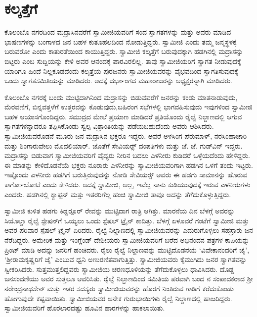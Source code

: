
\chapter{ಕಲ್ಕತ್ತೆಗೆ}

 ಕೊಲಂಬೊ ನಗರದಿಂದ ಮದ್ರಾಸಿನವರೆಗೆ ಸ್ವಾಮೀಜಿಯವರಿಗೆ ಸಂದ ಸ್ವಾಗತಗಳನ್ನು ಮತ್ತು ಅವರು ಮಾಡಿದ ಭಾಷಣಗಳನ್ನು ಬಂಗಾಳದ ಜನ ಬಹಳ ಕುತೂಹಲದಿಂದ ನೋಡುತ್ತಿದ್ದರು. ಸ್ವಾಮೀಜಿ ಎಂದು ತಮ್ಮ ಜನ್ಮಸ್ಥಳಕ್ಕೆ ಬರುವರೋ ಎಂದು ಕಾತುರತೆಯಿಂದ ಕಾಯುತ್ತಿದ್ದರು. ಸ್ವಾಮೀಜಿ ಕಲ್ಕತ್ತೆಗೆ ಬರುವುದಕ್ಕಾಗಿ ಹಡಗಿನಲ್ಲಿ ಮದ್ರಾಸನ್ನು ಬಿಟ್ಟರು ಎಂಬ ಸುದ್ದಿಯನ್ನು ಕೇಳಿ ಅವರ ಆನಂದಕ್ಕೆ ಪಾರವಿರಲಿಲ್ಲ. ತಾವು ಸ್ವಾಮೀಜಿಯರಿಗೆ ಸ್ವಾಗತ ನೀಡುವುದಕ್ಕೆ ಯಾರಿಗೂ ಹಿಂದೆ ನಿಲ್ಲಕೂಡದೆಂದು ಕಲ್ಕತ್ತೆಯ ಪುರಜನರು ಸ್ವಾಮೀಜಿಯವರನ್ನು ವೈಭವದಿಂದ ಸ್ವಾಗತಿಸುವುದಕ್ಕೆ ಒಂದು ಸ್ವಾಗತಸಮಿತಿಯನ್ನು ಮಾಡಿದರು. ಅದಕ್ಕೆ ದರ್ಭಾಂಗದ ಮಹಾರಾಜರನ್ನು ಅಧ್ಯಕ್ಷರನ್ನಾಗಿ ಮಾಡಿದರು. 

\newpage

 ಕೊಲಂಬೊ ನಗರಕ್ಕೆ ಬಂದು ಮುಟ್ಟಿದಾಗಿನಿಂದ ಮದ್ರಾಸನ್ನು ಬಿಡುವವರೆಗೆ ಜನರನ್ನು ಕಂಡು ಮಾತನಾಡುವುದು, ಮೆರವಣಿಗೆ, ಬಿನ್ನವತ್ತಳೆಗೆ ಉತ್ತರವನ್ನು ಕೊಡುವುದು,\break ಬಹಿರಂಗ ಸಭೆಗಳಲ್ಲಿ ಭಾಗವಹಿಸುವುದು ಇವುಗಳಿಂದ ಸ್ವಾಮೀಜಿ ಬಹಳ ಆಯಾಸಗೊಂಡಿದ್ದರು. ಸಮುದ್ರದ ಮೇಲೆ ಪ್ರಯಾಣ ಮಾಡಿದರೆ ಪ್ರತಿಯೊಂದು ರೈಲ್ವೆ ನಿಲ್ದಾಣದಲ್ಲಿ ಆಗುವ ಸ್ವಾಗತಗಳನ್ನಾದರೂ ತಪ್ಪಿಸಿಕೊಂಡು ಸ್ವಲ್ಪ ವಿಶ್ರಾಂತಿಯನ್ನು ಪಡೆಯಬಹುದೆಂದು ಅವರು ಆಶಿಸಿದರು. ಸ್ವಾಮೀಜಿಯವರೊಡನೆ ಮೂರು ಜನ ಮದ್ರಾಸಿನ ಭಕ್ತರೂ ಇದ್ದರು. ಅವರೆ ಅಳಸಿಂಗ ಪೆರುಮಾಳ್, ನರಸಿಂಹಾಚಾರಿ ಮತ್ತು ಶಿಂಗಾರುವೇಲು ಮೊದಲಿಯಾರ್. ಜೊತೆಗೆ ಸೇವಿಯರ್ಸ್‍‍ ದಂಪತಿಗಳು ಮತ್ತು ಜೆ. ಜೆ. ಗುಡ್‍ವಿನ್ ಇದ್ದರು. ಮದ್ರಾಸನ್ನು ಬಿಡುವಾಗ ಸ್ವಾಮೀಜಿಯವರಿಗೆ ವೈದ್ಯರು ನೀರಿನ ಬದಲು ಎಳನೀರು ಕುಡಿದರೆ ಒಳ್ಳೆಯದೆಂದು ಹೇಳಿದ್ದರು. ಈ ಮಾತನ್ನು ಕೇಳಿದೊಡನೆಯೆ ಭಕ್ತರು ನೂರಾರು ಎಳನೀರನ್ನು ಸ್ವಾಮೀಜಿಯವರಿಗಾಗಿ ಹಡಗಿನ ಒಳಗೆ ತಂದು ಇಟ್ಟರು. ಇಷ್ಟೊಂದು ಎಳನೀರು ಹಡಗಿಗೆ ಬರುತ್ತಿರುವುದನ್ನು ನೋಡಿ ಸೇವಿಯರ್ಸ್‍‍ ಅವರು ಈ ಹಡಗು ಸಾಮಾನನ್ನು ಹೊರುವ ಕಾರ್ಗೋಬೋಟೆ ಎಂದು ಕೇಳಿದರು. ಅದಕ್ಕೆ ಸ್ವಾಮೀಜಿ, ಅಲ್ಲ, ಇವೆಲ್ಲ ನಾನು ಕುಡಿಯುವುದಕ್ಕೆ ಇರುವ ಎಳನೀರುಗಳು ಎಂದರು. ಹಡಗಿನಲ್ಲಿ ಕ್ಯಾಪ್ಟನ್ ಮತ್ತು ಇತರರಿಗೆಲ್ಲ ಹಂಚಿ ಸ್ವಾಮೀಜಿ ತಾವೂ ಅದನ್ನು ತೆಗೆದುಕೊಳ್ಳುತ್ತಿದ್ದರು. 

\vskip 3pt

 ಸ್ವಾಮೀಜಿ ಕುಳಿತ ಹಡಗು ಕಿಡ್ಡರ್‍ಪೂರ್ ರೇವನ್ನು ಮುಟ್ಟಿದಾಗ ರಾತ್ರಿ ಆಗಿತ್ತು. ಮಾರನೆಯ ದಿನ ಬೆಳಗ್ಗೆ ಅವರನ್ನು ಸಿಯೊಲ್ಡಾ ರೈಲ್ವೆ ಸ್ಟೇಷನ್‍ಗೆ ಒಯ್ಯಲು ಒಂದು ಸ್ಪೆಷಲ್ ಟ್ರೈನ್ ಕಾದಿತ್ತು. ಬೆಳಗ್ಗೆ ಏಳೂವರೆ ಗಂಟೆಗೆ ಸ್ವಾಮೀಜಿ ಮತ್ತು ಅವರ ಪರಿವಾರ ಸ್ಪೆಷಲ್ ಟ್ರೈನ್ ಏರಿದರು. ರೈಲ್ವೆ ನಿಲ್ದಾಣದಲ್ಲಿ ಸ್ವಾಮೀಜಿಯವರನ್ನು ಎದುರುಗೊಳ್ಳಲು ಸಹಸ್ರಾರು ಜನ ನೆರೆದಿದ್ದರು. ಅಮೇರಿಕ ಮತ್ತು ಇಂಗ್ಲೆಂಡ್ ದೇಶೀಯರು ಸ್ವಾಮೀಜಿಯವರಿಗೆ ಬರೆದ ಅಭಿನಂದನ ಪತ್ರಗಳ ಕಾಪಿಯನ್ನು ಪ್ರಿಂಟ್ ಮಾಡಿ ಅದನ್ನು ಜನರಿಗೆ ಹಂಚಿದರು. ರೈಲು ರೈಲ್ವೆ ನಿಲ್ದಾಣವನ್ನು ಮುಟ್ಟಿದೊಡನೆಯೆ ‘ವಿವೇಕಾನಂದರಿಗೆ ಜೈ’, ‘ಶ‍್ರೀರಾಮಕೃಷ್ಣರಿಗೆ ಜೈ’ ಎಂಬುವ ಧ್ವನಿ ಅಣುರಣಿತವಾಗುತ್ತಿತ್ತು. ಸ್ವಾಮೀಜಿಯವರು ಕೈಮುಗಿದು ಜನರ ಸ್ವಾಗತವನ್ನು ಸ್ವೀಕರಿಸಿದರು. ಸುತ್ತಮುತ್ತಲಿದ್ದವರು ಸ್ವಾಮೀಜಿಯ ಚರಣಧೂಳಿಯನ್ನು ತೆಗೆದುಕೊಳ್ಳಲು ಧಾವಿಸಿದರು. ದೊಡ್ಡ ಜನಸಂದಣಿಯು ಅವರ ಸುತ್ತಲೂ ಆವರಿಸಿತು. ರೈಲ್ವೆ ನಿಲ್ದಾಣದಿಂದ ಸಮಿತಿಯ ಪರವಾಗಿ ಬಂದ  ನ ಸಂಪಾದಕರಾದ ಶ‍್ರೀ ನರೇಂದ್ರನಾಥಸೇನ್ ಮತ್ತು ಇತರ ಸದಸ್ಯರು ಸ್ವಾಮೀಜಿಯವರನ್ನು ಹೊರಗೆ ನಿಂತಿರುವ ಗಾಡಿಗೆ ಕರೆದುಕೊಂಡು ಹೋಗುವುದೇ ಕಷ್ಟವಾಯಿತು. ಸ್ವಾಮೀಜಿಯವರ ಅನೇಕ ಗುರುಭಾಯಿಗಳು ರೈಲ್ವೆ ನಿಲ್ದಾಣದಲ್ಲಿ ಹಾಜರಿದ್ದರು. ಸ್ವಾಮೀಜಿಯವರಿಗೆ ಹೊರಲಾರದಷ್ಟು ಹೂವಿನ ಹಾರಗಳನ್ನು ಹಾಕಲಾಯಿತು. 

